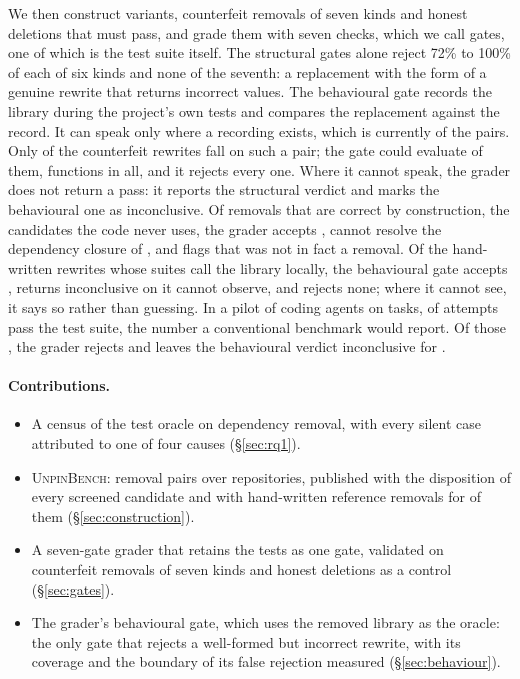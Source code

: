 \documentclass[11pt]{article}
\newcommand{\bench}{\textsc{UnpinBench}}
\begin{document}
We then construct \nVariants{} variants, \nCounterfeit{} counterfeit removals of seven kinds and \nHonest{} honest deletions that must pass, and grade them with seven checks, which we call gates, one of which is the test suite itself.
The structural gates alone reject 72\% to 100\% of each of six kinds and none of the seventh: a replacement with the form of a genuine rewrite that returns incorrect values.
The behavioural gate records the library during the project's own tests and compares the replacement against the record.
It can speak only where a recording exists, which is currently \nTracedPairs{} of the \nPairs{} pairs.
Only \nPseudoTraced{} of the \nPseudo{} counterfeit rewrites fall on such a pair; the gate could evaluate \nPseudoEvaluable{} of them, \nPseudoFunctions{} functions in all, and it rejects every one.
Where it cannot speak, the grader does not return a pass: it reports the structural verdict and marks the behavioural one as inconclusive.
Of \nOverDeclGraded{} removals that are correct by construction, the candidates the code never uses, the grader accepts \nFRAccepted, cannot resolve the dependency closure of \nFRInconclusive, and flags \nFRFlagged{} that was not in fact a removal.
Of the \nRefsEvaluable{} hand-written rewrites whose suites call the library locally, the behavioural gate accepts \nRefsAccepted, returns inconclusive on \nRefsInconclusive{} it cannot observe, and rejects none; where it cannot see, it says so rather than guessing.
In a pilot of \nAgents{} coding agents on \nAgentTasks{} tasks, \nAgentPass{} of \nAgentAttempts{} attempts pass the test suite, the number a conventional benchmark would report.
Of those \nAgentPass, the grader rejects \nAgentRejected{} and leaves the behavioural verdict inconclusive for \nAgentInconclusive{}.

\paragraph{Contributions.}
\begin{itemize}
\item A census of the test oracle on dependency removal, with every silent case attributed to one of four causes (\S\ref{sec:rq1}).
\item \bench: \nPairs{} removal pairs over \nPoolRepos{} repositories, published with the disposition of every screened candidate and with hand-written reference removals for \nRefs{} of them (\S\ref{sec:construction}).
\item A seven-gate grader that retains the tests as one gate, validated on \nCounterfeit{} counterfeit removals of seven kinds and \nHonest{} honest deletions as a control (\S\ref{sec:gates}).
\item The grader's behavioural gate, which uses the removed library as the oracle: the only gate that rejects a well-formed but incorrect rewrite, with its coverage and the boundary of its false rejection measured (\S\ref{sec:behaviour}).
\end{itemize}
\end{document}
